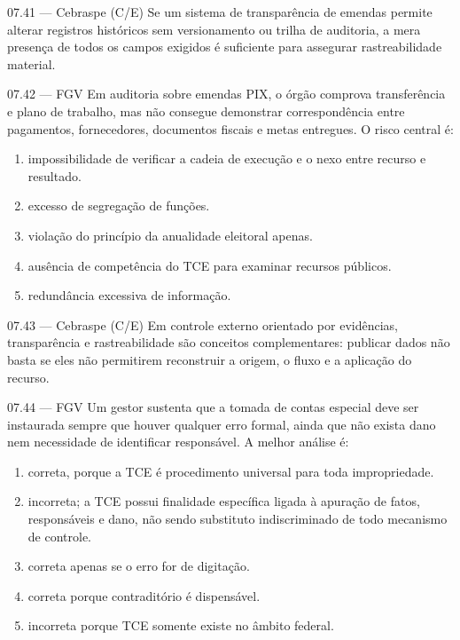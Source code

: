 \begin{questao}{ 07.41 — Cebraspe (C/E)}
Se um sistema de transparência de emendas permite alterar registros históricos sem versionamento ou trilha de auditoria, a mera presença de todos os campos exigidos é suficiente para assegurar rastreabilidade material.
\end{questao}

\begin{questao}{ 07.42 — FGV}
Em auditoria sobre emendas PIX, o órgão comprova transferência e plano de trabalho, mas não consegue demonstrar correspondência entre pagamentos, fornecedores, documentos fiscais e metas entregues. O risco central é:
\begin{enumerate}[label=\Alph*)]
\item impossibilidade de verificar a cadeia de execução e o nexo entre recurso e resultado.
\item excesso de segregação de funções.
\item violação do princípio da anualidade eleitoral apenas.
\item ausência de competência do TCE para examinar recursos públicos.
\item redundância excessiva de informação.
\end{enumerate}
\end{questao}

\begin{questao}{ 07.43 — Cebraspe (C/E)}
Em controle externo orientado por evidências, transparência e rastreabilidade são conceitos complementares: publicar dados não basta se eles não permitirem reconstruir a origem, o fluxo e a aplicação do recurso.
\end{questao}

\begin{questao}{ 07.44 — FGV}
Um gestor sustenta que a tomada de contas especial deve ser instaurada sempre que houver qualquer erro formal, ainda que não exista dano nem necessidade de identificar responsável. A melhor análise é:
\begin{enumerate}[label=\Alph*)]
\item correta, porque a TCE é procedimento universal para toda impropriedade.
\item incorreta; a TCE possui finalidade específica ligada à apuração de fatos, responsáveis e dano, não sendo substituto indiscriminado de todo mecanismo de controle.
\item correta apenas se o erro for de digitação.
\item correta porque contraditório é dispensável.
\item incorreta porque TCE somente existe no âmbito federal.
\end{enumerate}
\end{questao}

